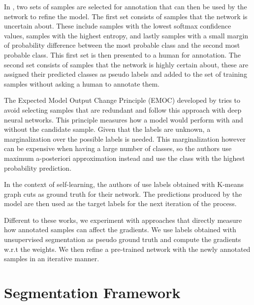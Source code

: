 \documentclass[letterpaper, 10 pt, conference]{ieeeconf}  %
\begin{document}
In \cite{wang2017cost}, two sets of samples are selected for annotation that can then be used by the network to refine the model. The first set consists of samples that the network is uncertain about. These include samples with the lowest softmax confidence values, samples with the highest entropy, and lastly samples with a small margin of probability difference between the most probable class and the second most probable class. This first set is then presented to a human for annotation. The second set consists of samples that the network is highly certain about, these are assigned their predicted classes as pseudo labels and added to the set of training samples without asking a human to annotate them.

The Expected Model Output Change Principle (EMOC) developed by \cite{freytag2014selecting} tries to avoid selecting samples that are redundant and \cite{kading2016active} follow this approach with deep neural networks. This principle measures how a model would perform with and without the candidate sample. Given that the labels are unknown, a marginalization over the possible labels is needed. This marginalization however can be expensive when having a large number of classes, so the authors use maximum a-posteriori approximation instead and use the class with the highest probability prediction.

In the context of self-learning, the authors of \cite{zhang2018self} use labels obtained with K-means graph cuts as ground truth for their network. The predictions produced by the model are then used as the target labels for the next iteration of the process.  

Different to these works, we experiment with approaches that directly measure how annotated samples can affect the gradients. We use labels obtained with unsupervised segmentation as pseudo ground truth and compute the gradients w.r.t the weights. We then refine a pre-trained network with the newly annotated samples in an iterative manner. 




\section{Segmentation Framework} \label{sec:approach}
\end{document}
